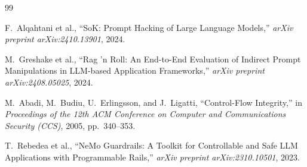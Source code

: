 \documentclass[conference]{IEEEtran}
\begin{document}
\begin{thebibliography}{99}

F.~Alqahtani et al., ``SoK: Prompt Hacking of Large Language Models,'' \textit{arXiv preprint arXiv:2410.13901}, 2024.

M.~Greshake et al., ``Rag 'n Roll: An End-to-End Evaluation of Indirect Prompt Manipulations in LLM-based Application Frameworks,'' \textit{arXiv preprint arXiv:2408.05025}, 2024.

M.~Abadi, M.~Budiu, U.~Erlingsson, and J.~Ligatti, ``Control-Flow Integrity,'' in \textit{Proceedings of the 12th ACM Conference on Computer and Communications Security (CCS)}, 2005, pp.~340--353.

T.~Rebedea et al., ``NeMo Guardrails: A Toolkit for Controllable and Safe LLM Applications with Programmable Rails,'' \textit{arXiv preprint arXiv:2310.10501}, 2023.

\end{thebibliography}
\end{document}
